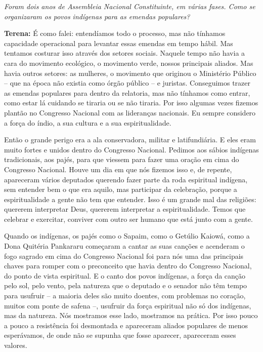 \emph{Foram dois anos de Assembleia Nacional Constituinte, em várias
fases. Como se organizaram os povos indígenas para as emendas
populares?}

\textbf{Terena:} É como falei: entendíamos todo o processo, mas não
tínhamos capacidade operacional para levantar essas emendas em tempo
hábil. Mas tentamos costurar isso através dos setores sociais. Naquele
tempo não havia a cara do movimento ecológico, o movimento verde, nossos
principais aliados. Mas havia outros setores: as mulheres, o movimento
que originou o Ministério Público -- que na época não existia como órgão
público -- e juristas. Conseguimos trazer as emendas populares para
dentro da relatoria, mas não tínhamos como entrar, como estar lá
cuidando se tiraria ou se não tiraria. Por isso algumas vezes fizemos
plantão no Congresso Nacional com as lideranças nacionais. Eu sempre
considero a força do índio, a sua cultura e a sua espiritualidade.

Então o grande perigo era a ala conservadora, militar e latifundiária. E
eles eram muito fortes e unidos dentro do Congresso Nacional. Pedimos
aos sábios indígenas tradicionais, aos pajés, para que viessem para
fazer uma oração em cima do Congresso Nacional. Houve um dia em que nós
fizemos isso e, de repente, apareceram vários deputados querendo fazer
parte da roda espiritual indígena, sem entender bem o que era aquilo,
mas participar da celebração, porque a espiritualidade a gente não tem
que entender. Isso é um grande mal das religiões: quererem interpretar
Deus, quererem interpretar a espiritualidade. Temos que celebrar e
exercitar, conviver com outro ser humano que está junto com a gente.

Quando os indígenas, os pajés como o Sapaim, como o Getúlio Kaiowá, como
a Dona Quitéria Pankararu começaram a cantar as suas canções e acenderam
o fogo sagrado em cima do Congresso Nacional foi para nós uma das
principais chaves para romper com o preconceito que havia dentro do
Congresso Nacional, do ponto de vista espiritual. E o canto dos povos
indígenas, a força da canção pelo sol, pelo vento, pela natureza que o
deputado e o senador não têm tempo para usufruir -- a maioria deles são
muito doentes, com problemas no coração, muitos com ponte de safena --,
usufruir da força espiritual não só dos indígenas, mas da natureza. Nós
mostramos esse lado, mostramos na prática. Por isso pouco a pouco a
resistência foi desmontada e apareceram aliados populares de menos
esperávamos, de onde não se supunha que fosse aparecer, apareceram esses
valores.

